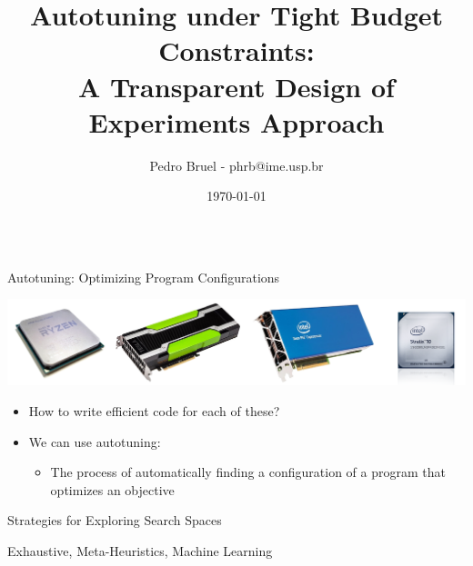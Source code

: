 \documentclass[11pt, compress, aspectratio=169, xcolor={table,usenames,dvipsnames}]{beamer}
\author{Pedro Bruel - phrb@ime.usp.br}
\date{\today}
\title{Autotuning under Tight Budget Constraints:  \\[0.3em] A Transparent Design of Experiments Approach}
\renewcommand\maketitle{}
\begin{document}
\maketitle

\begin{frame}
\begin{columns}
\begin{column}{0.89\columnwidth}
\begin{columns}
\begin{column}[t]{0.48\columnwidth}
\begin{block}{Autotuning: Optimizing Program Configurations}
\begin{center}
\includegraphics[width=.9\columnwidth]{../../../img/architectures.png}
\end{center}

\begin{itemize}
\item How to write \alert{efficient code} for each of these?
\item We can use \alert{autotuning}:
\begin{itemize}
\item The process of \alert{automatically finding} a \alert{configuration} of a program that
optimizes an \alert{objective}
\end{itemize}
\end{itemize}
\end{block}

\begin{block}{Strategies for Exploring Search Spaces}

\begin{center}
{\scriptsize
\colorbox{red!25}{Exhaustive},
\colorbox{green!25}{Meta-Heuristics},
\colorbox{cyan!25}{Machine Learning}
}
\vspace{.5em}
\end{center}


\end{block}
\end{column}
\end{columns}
\end{column}
\end{columns}
\end{frame}
\end{document}
